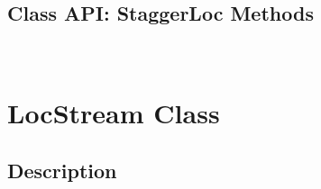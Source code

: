 \documentclass[english]{article}
\begin{document}
\subsection{Class API: StaggerLoc Methods}~\label{ref:stagsub}

%
%
%
%
%
%
%
% 
% 
\section{LocStream Class}
\subsection{Description}

\end{document}
